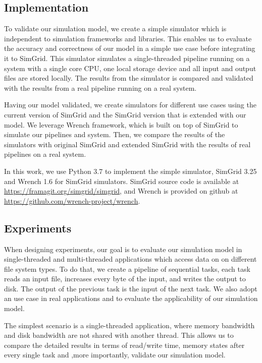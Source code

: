 \documentclass[conference]{IEEEtran}
\begin{document}
		\subsection{Implementation}

			To validate our simulation model, we create a simple 
			simulator which is independent to simulation frameworks and libraries. 
			This enables us to evaluate the accuracy and correctness of our 
			model in a simple use case before integrating it to SimGrid. 
			This simulator simulates a single-threaded pipeline running on a system 
			with a single core CPU, one local storage device and all input and 
			output files are stored locally. The results from the simulator is compared 
			and validated with the results from a real pipeline running on
			a real system.
			
			Having our model validated, we create simulators for different use cases 
			using the current version of SimGrid and the SimGrid version that is 
			extended with our model. We leverage Wrench framework, which is 
			built on top of SimGrid to simulate our pipelines and system.
			Then, we compare the results of the simulators with
			original SimGrid and extended SimGrid with the results of real
			pipelines on a real system. 
		
			In this work, we use Python 3.7 to implement the simple
			simulator, SimGrid 3.25 and Wrench 1.6 for SimGrid simulators. 
			SimGrid source code is available at 
			\url{https://framagit.org/simgrid/simgrid}, and Wrench is provided on
			github at \url{https://github.com/wrench-project/wrench}.
			
		\subsection{Experiments}
		
			When designing experiments, our goal is to evaluate our simulation model 
			in single-threaded and multi-threaded applications which access data on 
			on different file system types. 
			To do that, we create a pipeline of sequential tasks, each task 
			reads an input file, increases every byte of the input, and writes the 
			output to disk. The output of the previous task is the input of 
			the next task. We also adopt an use case in real applications and 
			to evaluate the applicability of our simulation model.
			
			The simplest scenario is a single-threaded application, where memory 
			bandwidth and disk bandwidth are not shared with another thread. 
			This allows us to compare the detailed results in terms of read/write time, 
			memory states after every single task and ,more importantly, validate our 
			simulation model. 
			
\end{document}
